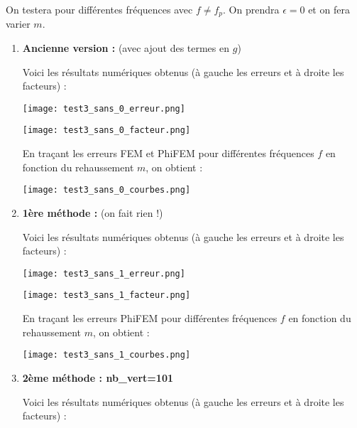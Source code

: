 On testera pour différentes fréquences avec $f\ne f_p$. On prendra $\epsilon=0$ et on fera varier $m$.

\begin{enumerate}[label=\textbullet]
	\item \textbf{Ancienne version :} (avec ajout des termes en $g$)
	
	Voici les résultats numériques obtenus (à gauche les erreurs et à droite les facteurs) :
	
	\begin{minipage}{0.52\linewidth}
		\centering
		\texttt{[image: test3\_sans\_0\_erreur.png]}
	\end{minipage}
	\begin{minipage}{0.44\linewidth}
		\centering
		\texttt{[image: test3\_sans\_0\_facteur.png]}
	\end{minipage}
	
	En traçant les erreurs FEM et PhiFEM pour différentes fréquences $f$ en fonction du rehaussement $m$, on obtient :
	
	\begin{minipage}{\linewidth}
		\centering
		\texttt{[image: test3\_sans\_0\_courbes.png]}
	\end{minipage}

	\item \textbf{1ère méthode :} (on fait rien !)
	
	Voici les résultats numériques obtenus (à gauche les erreurs et à droite les facteurs) :
	
	\begin{minipage}{0.48\linewidth}
		\centering
		\texttt{[image: test3\_sans\_1\_erreur.png]}
	\end{minipage}
	\begin{minipage}{0.48\linewidth}
		\centering
		\texttt{[image: test3\_sans\_1\_facteur.png]}
	\end{minipage}
	
	En traçant les erreurs PhiFEM pour différentes fréquences $f$ en fonction du rehaussement $m$, on obtient :
	
	\begin{minipage}{\linewidth}
		\centering
		\texttt{[image: test3\_sans\_1\_courbes.png]}
	\end{minipage}
	
	\item \textbf{2ème méthode : nb\_vert=101}
	
	Voici les résultats numériques obtenus (à gauche les erreurs et à droite les facteurs) :
	

\end{enumerate}
